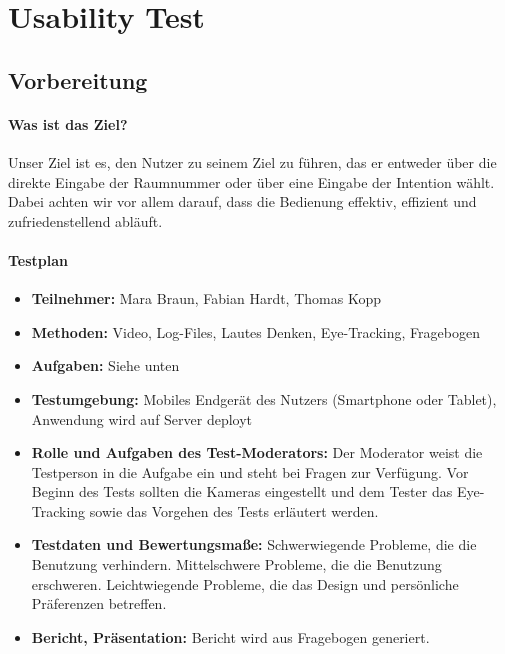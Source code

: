 \chapter{Usability Test}

\section{Vorbereitung}

\subsubsection*{Was ist das Ziel?}
Unser Ziel ist es, den Nutzer zu seinem Ziel zu führen, das er entweder über die direkte Eingabe der Raumnummer oder über eine Eingabe der Intention wählt.
Dabei achten wir vor allem darauf, dass die Bedienung effektiv, effizient und zufriedenstellend abläuft.
\subsubsection*{Testplan}
\begin{itemize}
\item \textbf{Teilnehmer:} Mara Braun, Fabian Hardt, Thomas Kopp
\item \textbf{Methoden:} Video, Log-Files, Lautes Denken, Eye-Tracking, Fragebogen
\item \textbf{Aufgaben:} Siehe unten
\item \textbf{Testumgebung:} Mobiles Endgerät des Nutzers (Smartphone oder Tablet), Anwendung wird auf Server deployt
\item \textbf{Rolle und Aufgaben des Test-Moderators:} Der Moderator weist die Testperson in die Aufgabe ein und steht bei Fragen zur Verfügung. Vor Beginn des Tests sollten die Kameras eingestellt und dem Tester das Eye-Tracking sowie das Vorgehen des Tests erläutert werden.
\item \textbf{Testdaten und Bewertungsmaße:} Schwerwiegende Probleme, die die Benutzung verhindern. Mittelschwere Probleme, die die Benutzung erschweren. Leichtwiegende Probleme, die das Design und persönliche Präferenzen betreffen.
\item \textbf{Bericht, Präsentation:} Bericht wird aus Fragebogen generiert.

\end{itemize}
